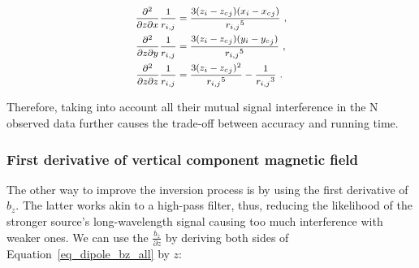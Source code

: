 \begin{equation}
\footnotesize
\begin{aligned}
\dfrac{\partial^2}{\partial z \partial x} \dfrac{1}{r_{i,j}} &=
\dfrac{3(z_i - {z_c}_j)(x_i - {x_c}_j)}{{r_{i,j}}^5}\ ,
\\
\dfrac{\partial^2}{\partial z \partial y} \dfrac{1}{r_{i,j}} &=
\dfrac{3(z_i - {z_c}_j)(y_i - {y_c}_j)}{{r_{i,j}}^5}\ ,
\\
\dfrac{\partial^2}{\partial z \partial z} \dfrac{1}{r_{i,j}} &=
\dfrac{3(z_i - {z_c}_j)^2}{{r_{i,j}}^5} - \dfrac{1}{{r_{i,j}}^3}\ .
\end{aligned}
\end{equation}   \bigskip

Therefore, taking into account all their mutual signal interference in the N observed data further causes the trade-off between accuracy and running time.




\subsubsection{First derivative of vertical component magnetic field}

The other way to improve the inversion process is by using the first derivative of $b_z$. The latter works  akin to a high-pass filter, thus, reducing the likelihood of the stronger source's long-wavelength signal causing too much interference with weaker ones. We can use the $\frac{b_z}{\partial z}$ by deriving both sides of Equation~\ref{eq_dipole_bz_all} by $z$:

